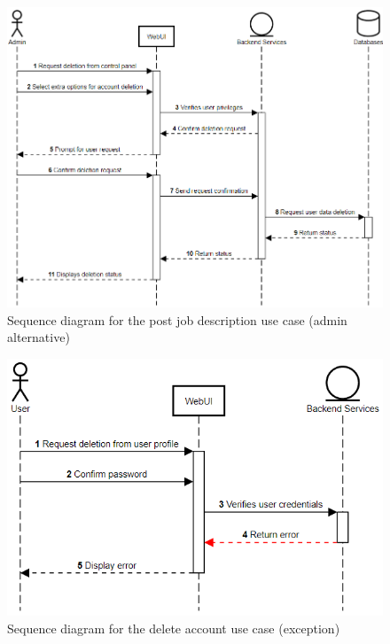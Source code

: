 \documentclass[a4paper]{article}
\begin{document}
    \begin{figure}[ht]
        \centering
        \includegraphics[width=1.0\textwidth]{delete_account (admin).png}
        \caption{Sequence diagram for the post job description use case (admin alternative)}
        \label{fig:fig18}
    \end{figure}

    \begin{figure}[ht]
        \centering
        \includegraphics[width=1.0\textwidth]{delete_account (exception).png}
        \caption{Sequence diagram for the delete account use case (exception)}
        \label{fig:fig19}
    \end{figure}
\end{document}
